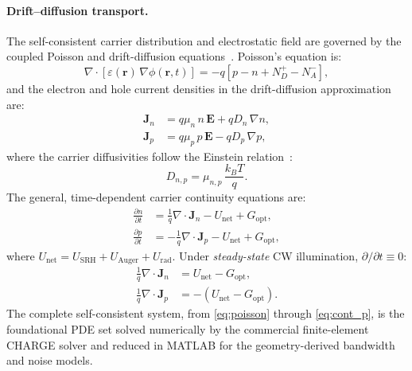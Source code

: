 \paragraph{Drift--diffusion transport.}
The self-consistent carrier distribution and electrostatic field are governed
by the coupled Poisson and drift-diffusion equations~\cite{SzeNg2006,Yariv1997}.
Poisson's equation is:
\begin{equation}
    \nabla\cdot\!\left[\varepsilon(\mathbf{r})\,\nabla\phi(\mathbf{r},t)\right]
    = -q\!\left[p - n + N_D^+ - N_A^-\right],
    \label{eq:poisson}
\end{equation}
and the electron and hole current densities in the drift-diffusion approximation
are:
\begin{align}
    \mathbf{J}_n &= q\mu_n\,n\,\mathbf{E} + qD_n\,\nabla n,
        \label{eq:Jn}\\
    \mathbf{J}_p &= q\mu_p\,p\,\mathbf{E} - qD_p\,\nabla p,
        \label{eq:Jp}
\end{align}
where the carrier diffusivities follow the Einstein relation~\cite{Hamadou2023}:
\begin{equation}
    D_{n,p} = \mu_{n,p}\,\frac{k_B T}{q}.
    \label{eq:einstein}
\end{equation}
The general, time-dependent carrier continuity equations are:
\begin{align}
    \frac{\partial n}{\partial t}
        &= \frac{1}{q}\nabla\cdot\mathbf{J}_n
           - U_{\mathrm{net}} + G_{\mathrm{opt}},
        \label{eq:cont_n_transient}\\
    \frac{\partial p}{\partial t}
        &= -\frac{1}{q}\nabla\cdot\mathbf{J}_p
           - U_{\mathrm{net}} + G_{\mathrm{opt}},
        \label{eq:cont_p_transient}
\end{align}
where $U_{\mathrm{net}}=U_{\mathrm{SRH}}+U_{\mathrm{Auger}}+U_{\mathrm{rad}}$.
Under \emph{steady-state} CW illumination, $\partial/\partial t\equiv0$:
\begin{align}
    \frac{1}{q}\nabla\cdot\mathbf{J}_n &= U_{\mathrm{net}} - G_{\mathrm{opt}},
        \label{eq:cont_n}\\
    \frac{1}{q}\nabla\cdot\mathbf{J}_p &= -(U_{\mathrm{net}} - G_{\mathrm{opt}}).
        \label{eq:cont_p}
\end{align}
The complete self-consistent system, from \cref{eq:poisson} through
\cref{eq:cont_p}, is the foundational PDE set solved numerically by the
commercial finite-element CHARGE solver and reduced in MATLAB for the
geometry-derived bandwidth and noise models.

